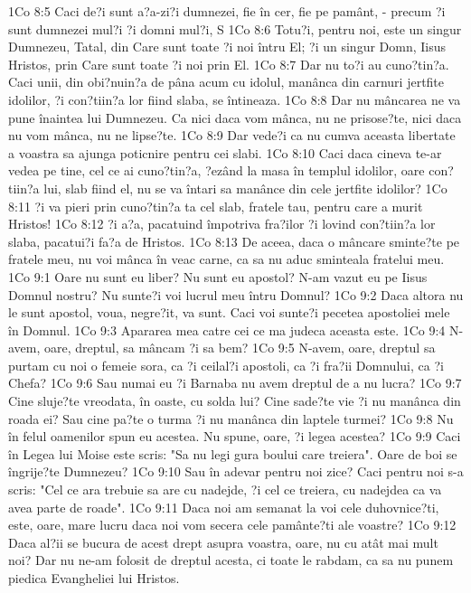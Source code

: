 1Co 8:5  Caci de?i sunt a?a-zi?i dumnezei, fie în cer, fie pe pamânt, - precum ?i sunt dumnezei mul?i ?i domni mul?i, S
1Co 8:6  Totu?i, pentru noi, este un singur Dumnezeu, Tatal, din Care sunt toate ?i noi întru El; ?i un singur Domn, Iisus Hristos, prin Care sunt toate ?i noi prin El.
1Co 8:7  Dar nu to?i au cuno?tin?a. Caci unii, din obi?nuin?a de pâna acum cu idolul, manânca din carnuri jertfite idolilor, ?i con?tiin?a lor fiind slaba, se întineaza.
1Co 8:8  Dar nu mâncarea ne va pune înaintea lui Dumnezeu. Ca nici daca vom mânca, nu ne prisose?te, nici daca nu vom mânca, nu ne lipse?te.
1Co 8:9  Dar vede?i ca nu cumva aceasta libertate a voastra sa ajunga poticnire pentru cei slabi.
1Co 8:10  Caci daca cineva te-ar vedea pe tine, cel ce ai cuno?tin?a, ?ezând la masa în templul idolilor, oare con?tiin?a lui, slab fiind el, nu se va întari sa manânce din cele jertfite idolilor?
1Co 8:11  ?i va pieri prin cuno?tin?a ta cel slab, fratele tau, pentru care a murit Hristos!
1Co 8:12  ?i a?a, pacatuind împotriva fra?ilor ?i lovind con?tiin?a lor slaba, pacatui?i fa?a de Hristos.
1Co 8:13  De aceea, daca o mâncare sminte?te pe fratele meu, nu voi mânca în veac carne, ca sa nu aduc sminteala fratelui meu.
1Co 9:1  Oare nu sunt eu liber? Nu sunt eu apostol? N-am vazut eu pe Iisus Domnul nostru? Nu sunte?i voi lucrul meu întru Domnul?
1Co 9:2  Daca altora nu le sunt apostol, voua, negre?it, va sunt. Caci voi sunte?i pecetea apostoliei mele în Domnul.
1Co 9:3  Apararea mea catre cei ce ma judeca aceasta este.
1Co 9:4  N-avem, oare, dreptul, sa mâncam ?i sa bem?
1Co 9:5  N-avem, oare, dreptul sa purtam cu noi o femeie sora, ca ?i ceilal?i apostoli, ca ?i fra?ii Domnului, ca ?i Chefa?
1Co 9:6  Sau numai eu ?i Barnaba nu avem dreptul de a nu lucra?
1Co 9:7  Cine sluje?te vreodata, în oaste, cu solda lui? Cine sade?te vie ?i nu manânca din roada ei? Sau cine pa?te o turma ?i nu manânca din laptele turmei?
1Co 9:8  Nu în felul oamenilor spun eu acestea. Nu spune, oare, ?i legea acestea?
1Co 9:9  Caci în Legea lui Moise este scris: "Sa nu legi gura boului care treiera". Oare de boi se îngrije?te Dumnezeu?
1Co 9:10  Sau în adevar pentru noi zice? Caci pentru noi s-a scris: "Cel ce ara trebuie sa are cu nadejde, ?i cel ce treiera, cu nadejdea ca va avea parte de roade".
1Co 9:11  Daca noi am semanat la voi cele duhovnice?ti, este, oare, mare lucru daca noi vom secera cele pamânte?ti ale voastre?
1Co 9:12  Daca al?ii se bucura de acest drept asupra voastra, oare, nu cu atât mai mult noi? Dar nu ne-am folosit de dreptul acesta, ci toate le rabdam, ca sa nu punem piedica Evangheliei lui Hristos.
